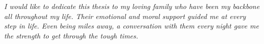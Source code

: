 \chapter*{}
\begin{center}
{\centering \it I would like to dedicate this thesis to my loving family who have been my backbone all throughout my life. Their emotional and moral support guided me at every step in life. Even being miles away, a conversation with them every night gave me the strength to get through the tough times.}
\end{center} 